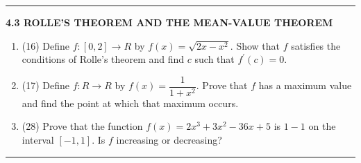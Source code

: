 \documentclass[fleqn]{article}
\begin{document}
  \rule{15cm}{1pt}

  \textbf{4.3 ROLLE'S THEOREM AND THE MEAN-VALUE THEOREM}
  \begin{enumerate}
    \item (16) Define $f: [0, 2] \longrightarrow R$ by $f(x)=\sqrt{2x-x^2}$. Show that $f$ satisfies the conditions of Rolle's
    theorem and find $c$ such that $f^'(c)=0$.



    \item (17) Define $f: R \longrightarrow R$ by $f(x)=\dfrac{1}{1+x^2}$. Prove that $f$ has a maximum value and find the
    point at which that maximum occurs.



    \item (28) Prove that the function $f(x)=2x^3+3x^2-36x+5$ is $1-1$ on the interval $[-1,1]$. Is $f$ increasing or decreasing?



  \end{enumerate}

  \rule{15cm}{1pt}
\end{document}
